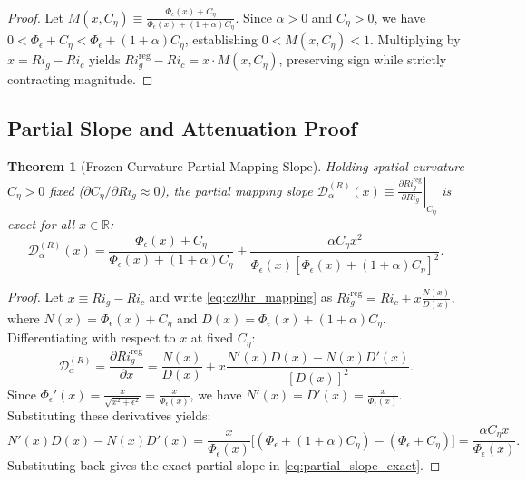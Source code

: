 \documentclass[11pt,a4paper]{article}
\newtheorem{theorem}{Theorem}
\begin{document}
\begin{proof}
Let $M(x, C_\eta) \equiv \frac{\Phi_\epsilon(x) + C_\eta}{\Phi_\epsilon(x) + (1+\alpha)C_\eta}$. Since $\alpha > 0$ and $C_\eta > 0$, we have $0 < \Phi_\epsilon + C_\eta < \Phi_\epsilon + (1+\alpha)C_\eta$, establishing $0 < M(x, C_\eta) < 1$. Multiplying by $x = Ri_g - Ri_c$ yields $Ri_g^{\text{reg}} - Ri_c = x \cdot M(x, C_\eta)$, preserving sign while strictly contracting magnitude.
\end{proof}

\subsection{Partial Slope and Attenuation Proof}

\begin{theorem}[Frozen-Curvature Partial Mapping Slope]
Holding spatial curvature $C_\eta > 0$ fixed ($\partial C_\eta / \partial Ri_g \approx 0$), the partial mapping slope $\mathcal{D}_\alpha^{(R)}(x) \equiv \left. \frac{\partial Ri_g^{\text{reg}}}{\partial Ri_g} \right|_{C_\eta}$ is exact for all $x \in \mathbb{R}$:
\begin{equation}
\mathcal{D}_\alpha^{(R)}(x) = \frac{\Phi_\epsilon(x) + C_\eta}{\Phi_\epsilon(x) + (1+\alpha)C_\eta} + \frac{\alpha C_\eta x^2}{\Phi_\epsilon(x) \left[ \Phi_\epsilon(x) + (1+\alpha)C_\eta \right]^2}.
\label{eq:partial_slope_exact}
\end{equation}
\end{theorem}

\begin{proof}
Let $x \equiv Ri_g - Ri_c$ and write \cref{eq:cz0hr_mapping} as $Ri_g^{\text{reg}} = Ri_c + x \frac{N(x)}{D(x)}$, where $N(x) = \Phi_\epsilon(x) + C_\eta$ and $D(x) = \Phi_\epsilon(x) + (1+\alpha)C_\eta$. Differentiating with respect to $x$ at fixed $C_\eta$:
\begin{equation}
\mathcal{D}_\alpha^{(R)} = \frac{\partial Ri_g^{\text{reg}}}{\partial x} = \frac{N(x)}{D(x)} + x \frac{N'(x) D(x) - N(x) D'(x)}{[D(x)]^2}.
\end{equation}
Since $\Phi_\epsilon'(x) = \frac{x}{\sqrt{x^2+\epsilon^2}} = \frac{x}{\Phi_\epsilon(x)}$, we have $N'(x) = D'(x) = \frac{x}{\Phi_\epsilon(x)}$. Substituting these derivatives yields:
\begin{equation}
N'(x) D(x) - N(x) D'(x) = \frac{x}{\Phi_\epsilon(x)} \Big[ (\Phi_\epsilon + (1+\alpha)C_\eta) - (\Phi_\epsilon + C_\eta) \Big] = \frac{\alpha C_\eta x}{\Phi_\epsilon(x)}.
\end{equation}
Substituting back gives the exact partial slope in \cref{eq:partial_slope_exact}.
\end{proof}
\end{document}
